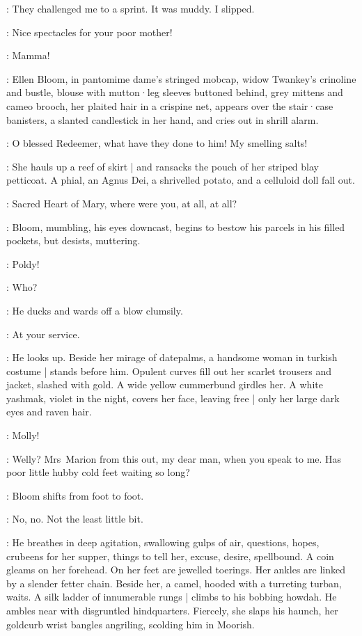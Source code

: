 \Bloom:
They challenged me to a sprint.
It was muddy.
I slipped.

\Rudolph:
Nice spectacles for your poor mother!

\Bloom:
Mamma!

:
Ellen Bloom,
in pantomime dame's stringed mobcap,
widow Twankey's crinoline and bustle,
blouse with mutton·leg sleeves buttoned behind,
grey mittens and cameo brooch,
her plaited hair in a crispine net,
appears over the stair·case banisters,
a slanted candlestick in her hand,
and cries out in shrill alarm.

\Ellen:
O blessed Redeemer,
what have they done to him!
My smelling salts!

:
She hauls up a reef of skirt |
and ransacks the pouch of her striped blay petticoat.
A phial,
an Agnus Dei,
a shrivelled potato,
and a celluloid doll fall out.

\Ellen:
Sacred Heart of Mary,
where were you,
at all,
at all?

:
Bloom,
mumbling,
his eyes downcast,
begins to bestow his parcels in his filled pockets,
but desists,
muttering.

\Marion:
Poldy!

\Bloom:
Who?

:
He ducks and wards off a blow clumsily.

\Bloom:
At your service.

:
He looks up.
Beside her mirage of datepalms,
a handsome woman in turkish costume |
stands before him.
Opulent curves fill out her scarlet trousers and jacket,
slashed with gold.
A wide yellow cummerbund girdles her.
A white yashmak,
violet in the night,
covers her face,
leaving free |
only her large dark eyes and raven hair.

\Bloom:
Molly!

\Marion[1]:
Welly?
Mrs~Marion from this out,
my dear man,
when you speak to me.
Has poor little hubby cold feet waiting so long?

:
Bloom shifts from foot to foot.

\Bloom:
No,
no.
Not the least little bit.

:
He breathes in deep agitation,
swallowing gulps of air,
questions,
hopes,
crubeens for her supper,
things to tell her,
excuse,
desire,
spellbound.
A coin gleams on her forehead.
On her feet are jewelled toerings.
Her ankles are linked by a slender fetter chain.
Beside her,
a camel,
hooded with a turreting turban,
waits.
A silk ladder of innumerable rungs |
climbs to his bobbing howdah.
He ambles near with disgruntled hindquarters.
Fiercely,
she slaps his haunch,
her goldcurb wrist bangles angriling,
scolding him in Moorish.

